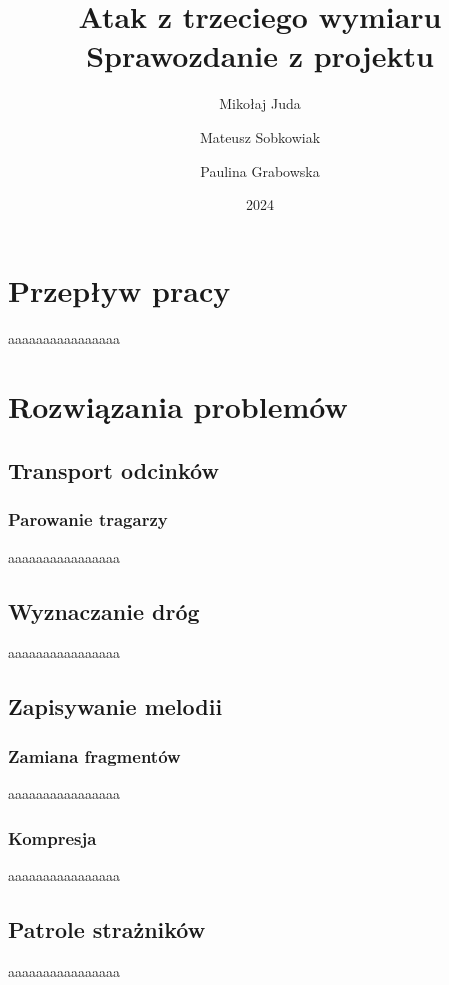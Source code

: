 \documentclass{article}
\title{Atak z trzeciego wymiaru \\\large Sprawozdanie z projektu}
\author{Mikołaj Juda \and Mateusz Sobkowiak \and Paulina Grabowska}
\date{2024}
\begin{document}
\maketitle
\section{Przepływ pracy}
aaaaaaaaaaaaaaaa
\section{Rozwiązania problemów}
\subsection{Transport odcinków}
\subsubsection{Parowanie tragarzy}
aaaaaaaaaaaaaaaa
\subsection{Wyznaczanie dróg}
aaaaaaaaaaaaaaaa
\subsection{Zapisywanie melodii}
\subsubsection{Zamiana fragmentów}
aaaaaaaaaaaaaaaa
\subsubsection{Kompresja}
aaaaaaaaaaaaaaaa
\subsection{Patrole strażników}
aaaaaaaaaaaaaaaa
\end{document}
